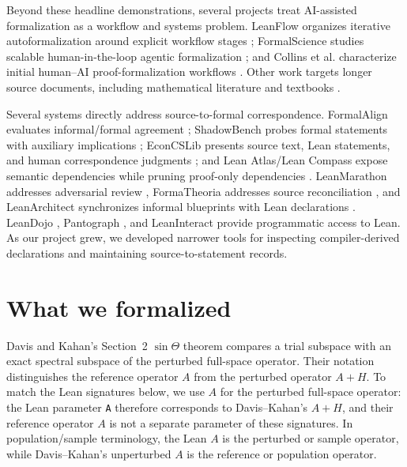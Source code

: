 \documentclass{article}
\begin{document}
Beyond these headline demonstrations, several projects treat AI-assisted
formalization as a workflow and systems problem.  LeanFlow organizes iterative
autoformalization around explicit workflow stages \citep{milikic2026leanflow};
FormalScience studies scalable human-in-the-loop agentic formalization
\citep{meadows2026formalscience}; and Collins et al. characterize initial
human--AI proof-formalization workflows \citep{collins2026humanai}.  Other work
targets longer source documents, including mathematical literature and
textbooks \citep{wang2026m2f,gloeckle2026textbook}.

Several systems directly address source-to-formal correspondence.
FormalAlign evaluates informal/formal agreement \citep{lu2025formalalign};
ShadowBench probes formal statements with auxiliary implications
\citep{han2026shadowbench}; EconCSLib presents source text, Lean statements,
and human correspondence judgments \citep{garg2026econcs}; and Lean
Atlas/Lean Compass expose semantic dependencies while pruning proof-only
dependencies \citep{yanahama2026leanatlas}.  LeanMarathon addresses
adversarial review \citep{zhang2026leanmarathon}, FormaTheoria addresses source
reconciliation \citep{nie2026formatheoria}, and LeanArchitect synchronizes
informal blueprints with Lean declarations \citep{zhu2026leanarchitect}.
LeanDojo \citep{yang2023leandojo}, Pantograph \citep{aniva2024pantograph}, and
LeanInteract \citep{poiroux2025leaninteract} provide programmatic access to
Lean.  As our project grew, we developed narrower tools for inspecting
compiler-derived declarations and maintaining source-to-statement records.

\section{What we formalized}
\label{sec:dk}

Davis and Kahan's Section~2 $\sin\Theta$ theorem compares a trial subspace
with an exact spectral subspace of the perturbed full-space operator.  Their
notation distinguishes the reference operator $A$ from the perturbed operator
$A+H$.  To match the Lean signatures below, we use $A$ for the perturbed
full-space operator: the Lean parameter \texttt{A} therefore corresponds to
Davis--Kahan's $A+H$, and their reference operator $A$ is not a separate
parameter of these signatures.  In population/sample terminology, the Lean
$A$ is the perturbed or sample operator, while Davis--Kahan's unperturbed $A$
is the reference or population operator.
\end{document}
